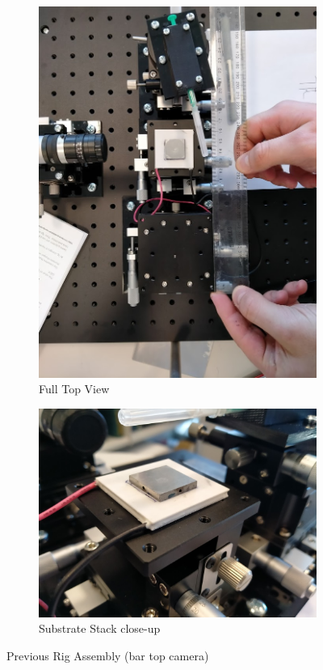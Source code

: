 \documentclass[11pt, a4paper, twoside, openright]{report}
\begin{document}
\begin{figure}
  \begin{subfigure}{.5\textwidth}
    \centering
    \includegraphics[height=.75\linewidth]{Figures/Full_rig_top.jpg}
    \caption{Full Top View}
  \end{subfigure}%
  \begin{subfigure}{.5\textwidth}
    \centering
    \includegraphics[height=.75\linewidth]{Figures/substrate_stack.jpg}
    \caption{Substrate Stack close-up}
  \end{subfigure}
  \caption{Previous Rig Assembly (bar top camera)}
  \label{fig::old_rig}
  \end{figure}

\newpage
\end{document}
